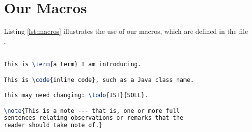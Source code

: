 \section{Our Macros}
\label{sec:ourmac}

Listing \ref{lst:macros} illustrates the use of our macros, which are defined in the file .

\begin{framed}
\begin{lstlisting}[label=lst:macros, caption={Our Macros}, language=TeX]

This is \term{a term} I am introducing.

This is \code{inline code}, such as a Java class name.

This may need changing: \todo{IST}{SOLL}.

\note{This is a note --- that is, one or more full
sentences relating observations or remarks that the
reader should take note of.}

\end{lstlisting}
\end{framed}




